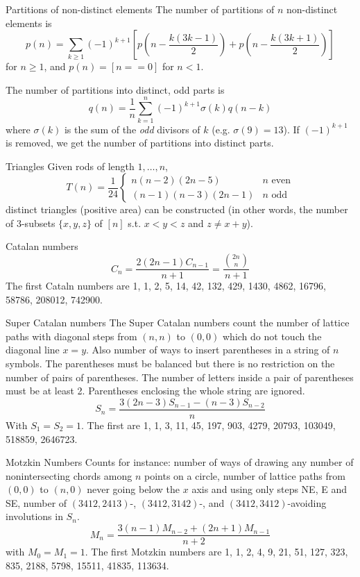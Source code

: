 \begin{algorithm}{Partitions of non-distinct elements}
\desc
The number of partitions of $n$ non-distinct elements is
$$p(n) = \sum_{k \ge 1} (-1)^{k+1} \left[p\left(n- \frac{k(3k-1)}{2}\right) + 
p\left(n-\frac{k(3k+1)}{2}\right)\right]$$
for $n \ge 1$, and $p(n) = [n == 0]$ for $n < 1$.

The number of partitions into distinct, odd parts is
$$q(n) = \frac{1}{n} \sum_{k = 1}^{n} (-1)^{k+1} \sigma(k) q(n-k)$$
where $\sigma(k)$ is the sum of the {\em odd} divisors of $k$
(e.g. $\sigma(9) = 13$).  If $(-1)^{k+1}$ is removed, we get the
number of partitions into distinct parts.

\end{algorithm}


\begin{algorithm}{Triangles}
\desc
Given rods of length $1, \ldots, n$, 
$$
T(n) = \frac{1}{24}\left\{\begin{array}{ll}
n(n-2)(2n-5) & \textrm{$n$ even}\\
(n-1)(n-3)(2n-1) & \textrm{$n$ odd}
\end{array}\right.$$
distinct triangles (positive area) can be constructed (in other words,
the number of $3$-subsets $\{x,y,z\}$ of $[n]$ s.t. $x < y < z$ and $z
\ne x+y$).
\end{algorithm}




\begin{algorithm}{Catalan numbers}
\desc
$$C_n = \frac{2(2n-1)C_{n-1}}{n+1} = \frac{\binom{2n}{n}}{\scriptstyle
n+1}$$
The first Cataln numbers are 1, 1, 2, 5, 14, 42, 132, 429, 1430, 4862,
16796, 58786, 208012, 742900.
\end{algorithm}

\begin{algorithm}{Super Catalan numbers}
\desc
The Super Catalan numbers count the number of lattice paths with
diagonal steps from $(n, n)$ to $(0,0)$ which do not touch the
diagonal line $x = y$.  Also number of ways to insert parentheses in a
string of $n$ symbols. The parentheses must be balanced but there is no
restriction on the number of pairs of parentheses. The number of
letters inside a pair of parentheses must be at least 2. Parentheses
enclosing the whole string are ignored.
$$S_n = \frac{3(2n-3)S_{n-1} - (n-3)S_{n-2}}{n}$$ With $S_1 = S_2 =
1$. The first are 1, 1, 3, 11, 45, 197, 903, 4279, 20793, 103049,
518859, 2646723.
\end{algorithm}

\begin{algorithm}{Motzkin Numbers}
\desc
Counts for instance: number of ways of drawing any number of
nonintersecting chords among $n$ points on a circle, number of lattice
paths from $(0,0)$ to $(n,0)$ never going below the $x$ axis and using
only steps NE, E and SE, number of $(3412,2413)$-, $(3412,3142)$-, and
$(3412,3412)$-avoiding involutions in $S_n$.
$$
M_n = \frac{3(n-1)M_{n-2} + (2n+1)M_{n-1}}{n+2}
$$
with $M_0 = M_1 = 1$.  The first Motzkin numbers are
1, 1, 2, 4, 9, 21, 51, 127, 323, 835, 2188, 5798, 15511, 41835, 113634.

\end{algorithm}

